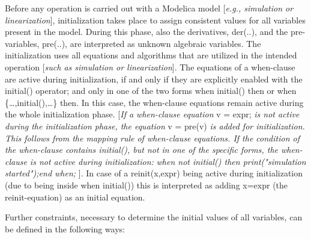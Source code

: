 \documentclass[10pt,a4paper]{report}
\begin{document}
Before any operation is carried out with a Modelica model {[}\emph{e.g.,
simulation or linearization}{]}, initialization takes place to assign
consistent values for all variables present in the model. During this
phase, also the derivatives, der(..), and the pre-variables, pre(..),
are interpreted as unknown algebraic variables. The initialization uses
all equations and algorithms that are utilized in the intended operation
{[}\emph{such as simulation or linearization}{]}. The equations of a
when-clause are active during initialization, if and only if they are
explicitly enabled with the initial() operator; and only in one of the
two forms when initial() then or when \{\ldots{},initial(),\ldots{}\}
then. In this case, the when-clause equations remain active during the
whole initialization phase. {[}\emph{If a when-clause equation} v =
expr; \emph{is not active during the initialization phase, the equation}
v = pre(v) \emph{is added for initialization. This follows from the
mapping rule of when-clause equations. If the condition of the
when-clause contains initial(), but not in one of the specific forms,
the when-clause is not active during initialization:} \emph{when not
initial() then print("simulation started");end when;} {]}. In case of a
reinit(x,expr) being active during initialization (due to being inside
when initial()) this is interpreted as adding x=expr (the
reinit-equation) as an initial equation.

Further constraints, necessary to determine the initial values of all
variables, can be defined in the following ways:
\end{document}
